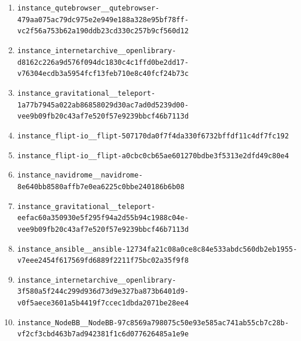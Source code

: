 \begin{enumerate}
\item \texttt{instance\_\allowbreak{}qutebrowser\_\allowbreak{}\_\allowbreak{}qutebrowser-\allowbreak{}479aa075ac79dc\allowbreak{}975e2e949e188a\allowbreak{}328e95bf78ff-\allowbreak{}vc2f56a753b62a\allowbreak{}190ddb23cd330c\allowbreak{}257b9cf560d12}
\item \texttt{instance\_\allowbreak{}internetarchiv\allowbreak{}e\_\allowbreak{}\_\allowbreak{}openlibrary-\allowbreak{}d8162c226a9d57\allowbreak{}6f094dc1830c4c\allowbreak{}1ffd0be2dd17-\allowbreak{}v76304ecdb3a59\allowbreak{}54fcf13feb710e\allowbreak{}8c40fcf24b73c}
\item \texttt{instance\_\allowbreak{}gravitational\_\allowbreak{}\_\allowbreak{}teleport-\allowbreak{}1a77b7945a022a\allowbreak{}b86858029d30ac\allowbreak{}7ad0d5239d00-\allowbreak{}vee9b09fb20c43\allowbreak{}af7e520f57e923\allowbreak{}9bbcf46b7113d}
\item \texttt{instance\_\allowbreak{}flipt-\allowbreak{}io\_\allowbreak{}\_\allowbreak{}flipt-\allowbreak{}507170da0f7f4d\allowbreak{}a330f6732bffdf\allowbreak{}11c4df7fc192}
\item \texttt{instance\_\allowbreak{}flipt-\allowbreak{}io\_\allowbreak{}\_\allowbreak{}flipt-\allowbreak{}a0cbc0cb65ae60\allowbreak{}1270bdbe3f5313\allowbreak{}e2dfd49c80e4}
\item \texttt{instance\_\allowbreak{}navidrome\_\allowbreak{}\_\allowbreak{}navidrome-\allowbreak{}8e640bb8580aff\allowbreak{}b7e0ea6225c0bb\allowbreak{}e240186b6b08}
\item \texttt{instance\_\allowbreak{}gravitational\_\allowbreak{}\_\allowbreak{}teleport-\allowbreak{}eefac60a350930\allowbreak{}e5f295f94a2d55\allowbreak{}b94c1988c04e-\allowbreak{}vee9b09fb20c43\allowbreak{}af7e520f57e923\allowbreak{}9bbcf46b7113d}
\item \texttt{instance\_\allowbreak{}ansible\_\allowbreak{}\_\allowbreak{}ansible-\allowbreak{}12734fa21c08a0\allowbreak{}ce8c84e533abdc\allowbreak{}560db2eb1955-\allowbreak{}v7eee2454f6175\allowbreak{}69fd6889f2211f\allowbreak{}75bc02a35f9f8}
\item \texttt{instance\_\allowbreak{}internetarchiv\allowbreak{}e\_\allowbreak{}\_\allowbreak{}openlibrary-\allowbreak{}3f580a5f244c29\allowbreak{}9d936d73d9e327\allowbreak{}ba873b6401d9-\allowbreak{}v0f5aece3601a5\allowbreak{}b4419f7ccec1db\allowbreak{}da2071be28ee4}
\item \texttt{instance\_\allowbreak{}NodeBB\_\allowbreak{}\_\allowbreak{}NodeBB-\allowbreak{}97c8569a798075\allowbreak{}c50e93e585ac74\allowbreak{}1ab55cb7c28b-\allowbreak{}vf2cf3cbd463b7\allowbreak{}ad942381f1c6d0\allowbreak{}77626485a1e9e}

\end{enumerate}
